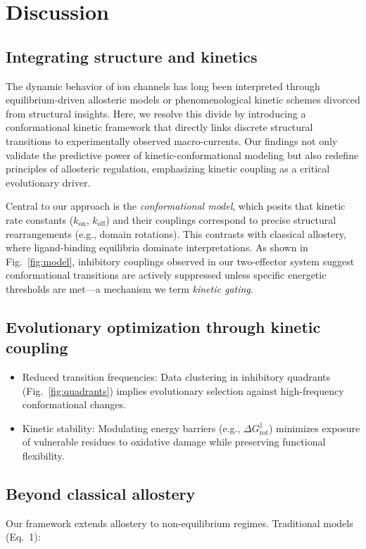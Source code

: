 \documentclass[a4paper,12pt]{article}
\begin{document}
	\section{Discussion}
	
	\subsection*{Integrating structure and kinetics}
	The dynamic behavior of ion channels has long been interpreted through equilibrium-driven allosteric models or phenomenological kinetic schemes divorced from structural insights. Here, we resolve this divide by introducing a conformational kinetic framework that directly links discrete structural transitions to experimentally observed macro-currents. Our findings not only validate the predictive power of kinetic-conformational modeling but also redefine principles of allosteric regulation, emphasizing kinetic coupling as a critical evolutionary driver. 
	
	Central to our approach is the \textit{conformational model}, which posits that kinetic rate constants ($k_{\text{on}}$, $k_{\text{off}}$) and their couplings correspond to precise structural rearrangements (e.g., domain rotations). This contrasts with classical allostery, where ligand-binding equilibria dominate interpretations. As shown in Fig.~\ref{fig:model}, inhibitory couplings observed in our two-effector system suggest conformational transitions are actively suppressed unless specific energetic thresholds are met—a mechanism we term \textit{kinetic gating}.
	
	\subsection*{Evolutionary optimization through kinetic coupling}
	\begin{itemize}
		\item Reduced transition frequencies: Data clustering in inhibitory quadrants (Fig.~\ref{fig:quadrants}) implies evolutionary selection against high-frequency conformational changes. 
		\item Kinetic stability: Modulating energy barriers (e.g., $\Delta G^{\ddagger}_{\text{rot}}$) minimizes exposure of vulnerable residues to oxidative damage while preserving functional flexibility.
	\end{itemize}
	
	\subsection*{Beyond classical allostery}
	Our framework extends allostery to non-equilibrium regimes. Traditional models (Eq.~1):
	
\end{document}
